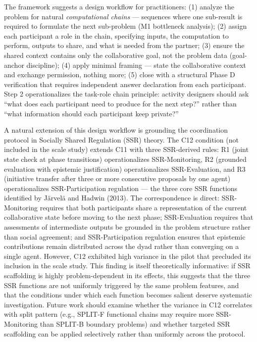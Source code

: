 \documentclass[
  11pt,
]{article}
\begin{document}
The framework suggests a design workflow for practitioners: (1) analyze
the problem for natural \emph{computational chains} --- sequences where
one sub-result is required to formulate the next sub-problem (M1
bottleneck analysis); (2) assign each participant a role in the chain,
specifying inputs, the computation to perform, outputs to share, and
what is needed from the partner; (3) ensure the shared context contains
only the collaborative goal, not the problem data (goal-anchor
discipline); (4) apply minimal framing --- state the collaborative
context and exchange permission, nothing more; (5) close with a
structural Phase D verification that requires independent answer
declaration from each participant. Step 2 operationalizes the task-role
chain principle: activity designers should ask ``what does each
participant need to produce for the next step?'' rather than ``what
information should each participant keep private?''

A natural extension of this design workflow is grounding the coordination protocol in Socially Shared Regulation (SSR) theory. The C12 condition (not included in the scale study) extends C11 with three SSR-derived rules: R1 (joint state check at phase transitions) operationalizes SSR-Monitoring, R2 (grounded evaluation with epistemic justification) operationalizes SSR-Evaluation, and R3 (initiative transfer after three or more consecutive proposals by one agent) operationalizes SSR-Participation regulation --- the three core SSR functions identified by Järvelä and Hadwin (2013). The correspondence is direct: SSR-Monitoring requires that both participants share a representation of the current collaborative state before moving to the next phase; SSR-Evaluation requires that assessments of intermediate outputs be grounded in the problem structure rather than social agreement; and SSR-Participation regulation ensures that epistemic contributions remain distributed across the dyad rather than converging on a single agent. However, C12 exhibited high variance in the pilot that precluded its inclusion in the scale study. This finding is itself theoretically informative: if SSR scaffolding is highly problem-dependent in its effects, this suggests that the three SSR functions are not uniformly triggered by the same problem features, and that the conditions under which each function becomes salient deserve systematic investigation. Future work should examine whether the variance in C12 correlates with split pattern (e.g., SPLIT-F functional chains may require more SSR-Monitoring than SPLIT-B boundary problems) and whether targeted SSR scaffolding can be applied selectively rather than uniformly across the protocol.
\end{document}
